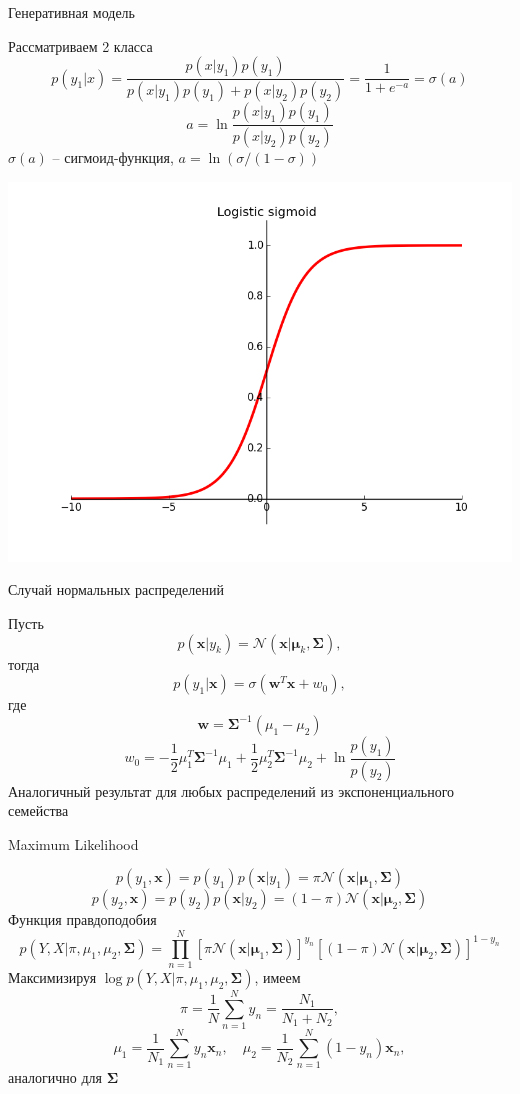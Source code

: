 \documentclass[aspectratio=169]{beamer}
\begin{document}
\begin{frame}{Генеративная модель}

Рассматриваем 2 класса
\[
p(y_1 | x) = \frac{p(x | y_1) p(y_1)}{p(x | y_1) p(y_1) + p(x | y_2) p(y_2)} = \frac{1}{1 + e^{-a}} = \sigma(a)
\]
\[
a = \ln \frac{p(x | y_1)p(y_1)}{p(x | y_2)p(y_2)}
\]
$\sigma(a)$ -- сигмоид-функция, $a = \ln (\sigma/(1-\sigma))$

\begin{center}
\includegraphics[scale=0.28]{images/sigmoid.png}
\end{center}

\end{frame}

\begin{frame}{Случай нормальных распределений}

Пусть 
\[
p(\mathbf{x} | y_k) = \mathcal{N}(\mathbf{x} | \mathbf{\mu}_k, \mathbf{\Sigma}),
\]
тогда
\[
p(y_1 | \mathbf{x}) = \sigma(\mathbf{w}^T \mathbf{x} + w_0),
\]
где
\[
\mathbf{w} = \mathbf{\Sigma}^{-1} (\mu_1 - \mu_2)
\]
\[
w_0 = - \frac 1 2 \mu_1^T \mathbf{\Sigma}^{-1} \mu_1 + \frac 1 2 \mu_2^T \mathbf{\Sigma}^{-1} \mu_2 + \ln \frac{p(y_1)}{p(y_2)}
\]
Аналогичный результат для любых распределений из экспоненциального семейства

\end{frame}

\begin{frame}{Maximum Likelihood}

\[
p(y_1, \mathbf{x}) = p(y_1) p(\mathbf{x} | y_1) = \pi \mathcal{N}(\mathbf{x} | \mathbf{\mu}_1, \mathbf{\Sigma})
\]
\[
p(y_2, \mathbf{x}) = p(y_2) p(\mathbf{x} | y_2) = (1 - \pi) \mathcal{N}(\mathbf{x} | \mathbf{\mu}_2, \mathbf{\Sigma})
\]
Функция правдоподобия
\[
p(Y, X | \pi, \mu_1, \mu_2, \mathbf{\Sigma}) = \prod_{n=1}^N \left[ \pi \mathcal{N}(\mathbf{x} | \mathbf{\mu}_1, \mathbf{\Sigma}) \right]^{y_n} \left[ (1 - \pi) \mathcal{N}(\mathbf{x} | \mathbf{\mu}_2, \mathbf{\Sigma}) \right]^{1 - y_n} 
\]
Максимизируя $\log p(Y, X | \pi, \mu_1, \mu_2, \mathbf{\Sigma})$, имеем
\[
\pi = \frac 1 N \sum_{n=1}^N y_n = \frac{N_1}{N_1 + N_2},
\]
\[
\mu_1 = \frac{1}{N_1} \sum_{n=1}^N y_n \mathbf{x}_n, \quad
\mu_2 = \frac{1}{N_2} \sum_{n=1}^N (1 - y_n) \mathbf{x}_n,
\]
аналогично для $\mathbf{\Sigma}$

\end{frame}
\end{document}
